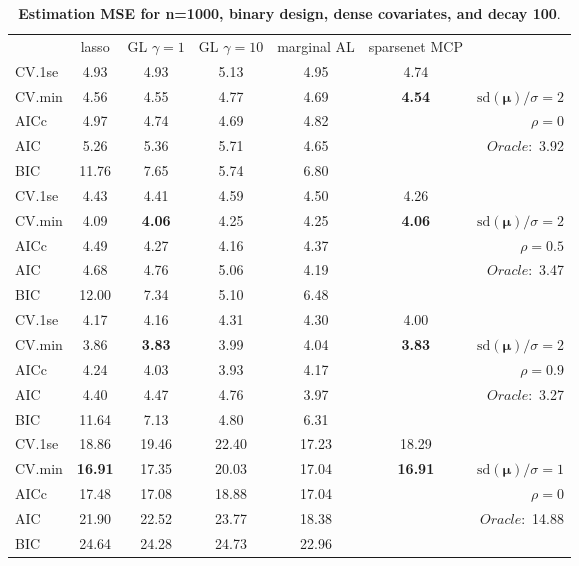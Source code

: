 \begin{table}\vspace{-.5cm}
\caption[l]{ { \bf Estimation MSE for n=1000, binary design, 
dense covariates, and  decay  100}.}
\vspace{-.5cm}
\footnotesize{}
\begin{center}
\begin{tabular}{l*{5}{c}|r}
& lasso & GL $\gamma=1$ & GL $\gamma=10$ & marginal AL & sparsenet MCP  & \\
 \cline{1-7}
CV.1se & 4.93 & 4.93 & 5.13 & 4.95 & 4.74 & \\
CV.min & 4.56 & 4.55 & 4.77 & 4.69 & {\bf 4.54} &  $\mathrm{sd}(\mathbf{\mu})/\sigma=2$ \\
AICc & 4.97 & 4.74 & 4.69 & 4.82 & & $\rho=0$ \\
AIC & 5.26 & 5.36 & 5.71 & 4.65 & &  \multirow{2}{*}{$Oracle: $ 3.92} \\
BIC & 11.76 & 7.65 & 5.74 & 6.80 & &  \\
 \hline 
CV.1se & 4.43 & 4.41 & 4.59 & 4.50 & 4.26 & \\
CV.min & 4.09 & {\bf 4.06} & 4.25 & 4.25 & {\bf 4.06} &  $\mathrm{sd}(\mathbf{\mu})/\sigma=2$ \\
AICc & 4.49 & 4.27 & 4.16 & 4.37 & & $\rho=0.5$ \\
AIC & 4.68 & 4.76 & 5.06 & 4.19 & &  \multirow{2}{*}{$Oracle: $ 3.47} \\
BIC & 12.00 & 7.34 & 5.10 & 6.48 & &  \\
 \hline 
CV.1se & 4.17 & 4.16 & 4.31 & 4.30 & 4.00 & \\
CV.min & 3.86 & {\bf 3.83} & 3.99 & 4.04 & {\bf 3.83} &  $\mathrm{sd}(\mathbf{\mu})/\sigma=2$ \\
AICc & 4.24 & 4.03 & 3.93 & 4.17 & & $\rho=0.9$ \\
AIC & 4.40 & 4.47 & 4.76 & 3.97 & &  \multirow{2}{*}{$Oracle: $ 3.27} \\
BIC & 11.64 & 7.13 & 4.80 & 6.31 & &  \\
 \hline 
CV.1se & 18.86 & 19.46 & 22.40 & 17.23 & 18.29 & \\
CV.min & {\bf 16.91} & 17.35 & 20.03 & 17.04 & {\bf 16.91} &  $\mathrm{sd}(\mathbf{\mu})/\sigma=1$ \\
AICc & 17.48 & 17.08 & 18.88 & 17.04 & & $\rho=0$ \\
AIC & 21.90 & 22.52 & 23.77 & 18.38 & &  \multirow{2}{*}{$Oracle: $ 14.88} \\
BIC & 24.64 & 24.28 & 24.73 & 22.96 & &  \\

\end{tabular}
\end{center}
\end{table}
